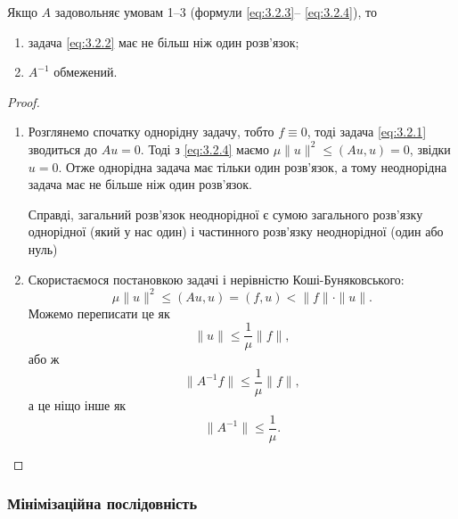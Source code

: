 \begin{theorem}
    Якщо $A$ задовольняє умовам 1--3 (формули \eqref{eq:3.2.3}-- \eqref{eq:3.2.4}), то
    \begin{enumerate}
        \item задача \eqref{eq:3.2.2} має не більш ніж один розв'язок;
        \item $A^{-1}$ обмежений.
    \end{enumerate}
\end{theorem}
\begin{proof}
    $\left.\right.$
    \begin{enumerate}
        \item Розглянемо спочатку однорідну задачу, тобто $f \equiv 0$, тоді задача \eqref{eq:3.2.1} зводиться до $A u = 0$. Тоді з \eqref{eq:3.2.4} маємо $\mu \|u\|^2 \le (Au, u) = 0$, звідки $u = 0$. Отже однорідна задача має тільки один розв'язок, а тому неоднорідна задача має не більше ніж один розв'язок.
        
        \begin{remark}
            Справді, загальний розв'язок неоднорідної є сумою загального розв'язку однорідної (який у нас один) і частинного розв'язку неоднорідної (один або нуль)
        \end{remark}
        \item Скористаємося постановкою задачі і нерівністю Коші-Буняковського:
        \begin{equation*}
            \mu \|u\|^2 \le (Au, u) = (f, u) < \|f\| \cdot \|u\|.
        \end{equation*}
        Можемо переписати це як
        \begin{equation*}
            \|u\| \le \frac{1}{\mu} \|f\|,
        \end{equation*}
        або ж
        \begin{equation*}
            \|A^{-1} f\| \le \frac{1}{\mu} \|f\|,
        \end{equation*}
        а це ніщо інше як
        \begin{equation*}
            \|A^{-1}\| \le \frac{1}{\mu}.
        \end{equation*}
    \end{enumerate}
\end{proof}

\subsubsection{Мінімізаційна послідовність}

